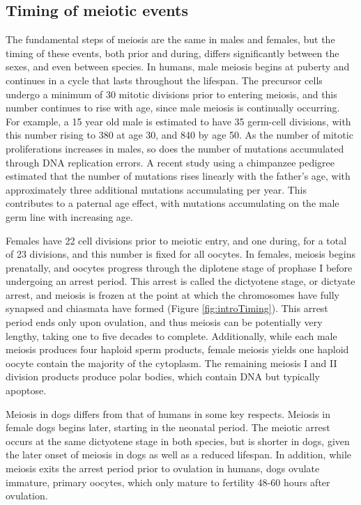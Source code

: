 \subsection{Timing of meiotic events}

The fundamental steps of meiosis are the same in males and females, but the timing of these events, both prior and during, differs significantly between the sexes\cite{Lynn2004}, and even between species.
In humans, male meiosis begins at puberty and continues in a cycle that lasts throughout the lifespan.
The precursor cells undergo a minimum of 30 mitotic divisions prior to entering meiosis, and this number continues to rise with age, since male meiosis is continually occurring.
For example, a 15 year old male is estimated to have 35 germ-cell divisions, with this number rising to 380 at age 30, and 840 by age 50\cite{Crow2000a}.
As the number of mitotic proliferations increases in males, so does the number of mutations accumulated through DNA replication errors.
A recent study using a chimpanzee pedigree estimated that the number of mutations rises linearly with the father's age, with approximately three additional mutations accumulating per year\cite{Venn2014}.
This contributes to a paternal age effect, with mutations accumulating on the male germ line with increasing age.

Females have 22 cell divisions prior to meiotic entry, and one during, for a total of 23 divisions\cite{Crow2000a}, and this number is fixed for all oocytes.
In females, meiosis begins prenatally, and oocytes progress through the diplotene stage of prophase I before undergoing an arrest period\cite{Hassold2001,Crow2000a}.
This arrest is called the dictyotene stage, or dictyate arrest, and meiosis is frozen at the point at which the chromosomes have fully synapsed and chiasmata have formed (Figure \ref{fig:introTiming}).
This arrest period ends only upon ovulation, and thus meiosis can be potentially very lengthy, taking one to five decades to complete.
Additionally, while each male meiosis produces four haploid sperm products, female meiosis yields one haploid oocyte contain the majority of the cytoplasm.
The remaining meiosis I and II division products produce polar bodies, which contain DNA but typically apoptose\cite{Schmerler2011}.


Meiosis in dogs differs from that of humans in some key respects.
Meiosis in female dogs begins later, starting in the neonatal period\cite{Freixa1987}.
The meiotic arrest occurs at the same dictyotene stage in both species, but is shorter in dogs, given the later onset of meiosis in dogs as well as a reduced lifespan.
In addition, while meiosis exits the arrest period prior to ovulation in humans, dogs ovulate immature, primary oocytes, which only mature to fertility 48-60 hours after ovulation\cite{Tsutsui1989,Chastant-Maillard2011}.

